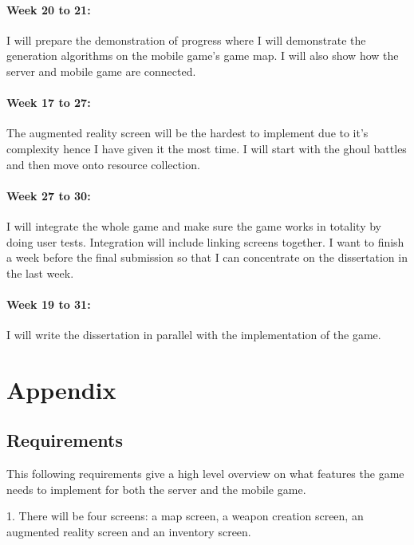 \documentclass{article}
\begin{document}
		\paragraph{Week 20 to 21:} I will prepare the demonstration of progress where I will demonstrate the generation algorithms on the mobile game's game map. I will also show how the server and mobile game are connected. 
		\newline
		\paragraph{Week 17 to 27:} The augmented reality screen will be the hardest to implement due to it's complexity hence I have given it the most time. I will start with the ghoul battles and then move onto resource collection. 
		\newline
		\paragraph{Week 27 to  30:} I will integrate the whole game and make sure the game works in totality by doing user tests. Integration will include linking screens together. I want to finish a week before the final submission so that I can concentrate on the dissertation in the last week. 
		\paragraph{Week 19 to 31:}
		I will write the dissertation in parallel with the implementation of the game.
		
		\section{Appendix}
		\subsection{Requirements}
		This following requirements give a high level overview on what features the game needs to implement for both the server and the mobile game. \newline
		
		1. There will be four screens: a map screen, a weapon creation screen, an augmented reality screen and an inventory screen.
		
\end{document}
